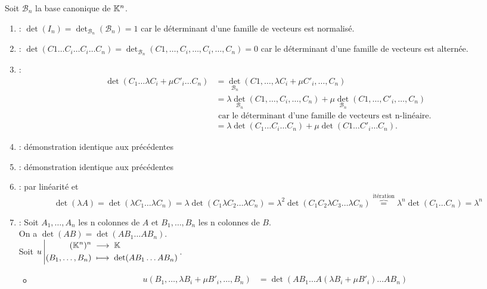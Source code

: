 \documentclass{book}
\begin{document}
\begin{Demonstration}
Soit $\mathcal{B}_n$ la base canonique de $\K^n$. 
\begin{enumerate}
\item {} : $\det(I_n) = \det_{\mathcal{B}_n}(\mathcal{B}_n)=1 $ car le déterminant d'une famille de vecteurs est normalisé. 
\item {} : $\det(C1\dots C_i\dots C_i \dots C_n) = \det_{\mathcal{B}_n}(C1,\dots, C_i,\dots, C_i, \dots, C_n)=0$ car le déterminant d'une famille de vecteurs est alternée. 
\item {} :
  $$\begin{aligned}
  \det (C_1 \dots  \lambda C_i+ \mu C'_i \dots C_n) &=  \det_{\mathcal{B}_n}(C1,\dots, \lambda C_i+ \mu C'_i, \dots, C_n)\\
                                                    &=  \lambda \det_{\mathcal{B}_n}(C1,\dots, C_i, \dots, C_n)+ \mu\det_{\mathcal{B}_n}(C1,\dots, C'_i, \dots, C_n) \\
                                                    &\text{ car le déterminant d'une famille de vecteurs est n-linéaire.}\\
                                                     &=  \lambda \det(C_1\dots C_i \dots C_n)+ \mu\det(C1\dots C'_i \dots C_n).\end{aligned}$$
\item {} : démonstration identique aux précédentes
\item {} : démonstration identique aux précédentes
\item {} : par linéarité et 
  $$\det(\lambda A) =\det(\lambda C_1\dots \lambda C_n)= \lambda\det( C_1 \lambda C_2\dots \lambda C_n )= \lambda^2\det( C_1 C_2 \lambda C_3\dots \lambda C_n )\overbrace{=}^{\text{itération}}\lambda^n\det( C_1\dots C_n )=\lambda^n$$
\item  {} : Soit $A_1,\dots,A_n$ les n colonnes de $A$ et $B_1,\dots,B_n$ les n colonnes de $B$.\\
On a $\det(AB)=\det(AB_1\dots AB_n)$.\\
Soit $\Fonction{u}{(\K^n)^n}{\K}{(B_1,\dots,B_n)}{\det(AB_1\dots AB_n)}$.
\begin{itemize}
\item {} $$\begin{aligned}
u(B_1,\dots,  \lambda B_i+ \mu B'_i, \dots, B_n)&=\det(AB_1\dots A(\lambda B_i+ \mu B'_i)\dots  AB_n)\\

\end{aligned}$$
\end{itemize}
\end{enumerate}
\end{Demonstration}
\end{document}

